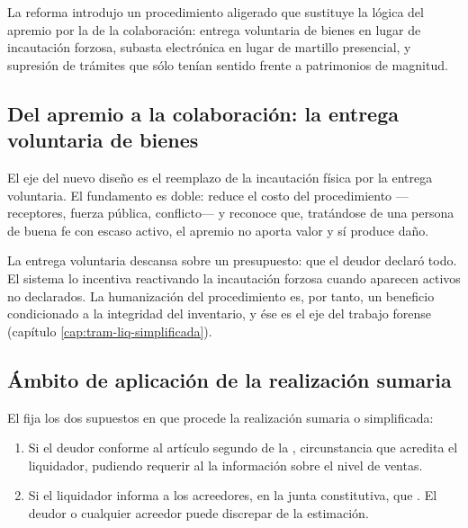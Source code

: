 La reforma introdujo un procedimiento aligerado que sustituye la lógica del apremio por la
de la colaboración: entrega voluntaria de bienes en lugar de incautación forzosa, subasta
electrónica en lugar de martillo presencial, y supresión de trámites que sólo tenían
sentido frente a patrimonios de magnitud.

\subsection{Del apremio a la colaboración: la entrega voluntaria de bienes}

El eje del nuevo diseño es el reemplazo de la incautación física por la entrega voluntaria.
El fundamento es doble: reduce el costo del procedimiento ---receptores, fuerza pública,
conflicto--- y reconoce que, tratándose de una persona de buena fe con escaso activo, el
apremio no aporta valor y sí produce daño.

\begin{foco}
La entrega voluntaria descansa sobre un presupuesto: que el deudor declaró todo. El sistema
lo incentiva reactivando la incautación forzosa cuando aparecen activos no declarados. La
humanización del procedimiento es, por tanto, un beneficio condicionado a la integridad del
inventario, y ése es el eje del trabajo forense (capítulo \ref{cap:tram-liq-simplificada}).
\end{foco}

\bloqueNormativo

\subsection{Ámbito de aplicación de la realización sumaria}

El  fija los dos supuestos en que procede la realización sumaria o simplificada:

\begin{enumerate}
  \item Si el deudor  conforme al artículo segundo de
  la \Lpyme{} \citeyearpar{ley-20416}, circunstancia que acredita el liquidador, pudiendo
  requerir al \sii{} la información sobre el nivel de ventas.
  \item Si el liquidador informa a los acreedores, en la junta constitutiva, que
  . El deudor o
  cualquier acreedor puede discrepar de la estimación.
\end{enumerate}

